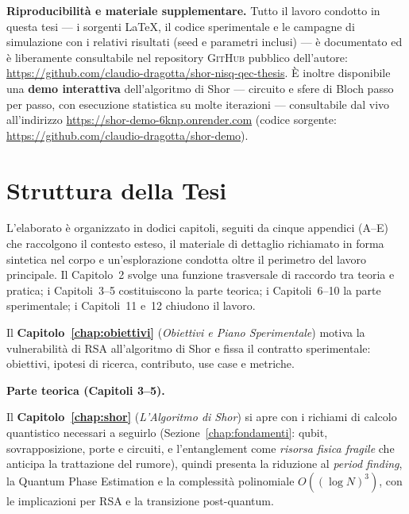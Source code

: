 \begin{onehalfspace}
\medskip
\noindent\textbf{Riproducibilità e materiale supplementare.} Tutto il lavoro condotto in questa tesi --- i sorgenti \LaTeX{}, il codice sperimentale e le campagne di simulazione con i relativi risultati (seed e parametri inclusi) --- è documentato ed è liberamente consultabile nel repository \textsc{GitHub} pubblico dell'autore: \url{https://github.com/claudio-dragotta/shor-nisq-qec-thesis}. È inoltre disponibile una \textbf{demo interattiva} dell'algoritmo di Shor --- circuito e sfere di Bloch passo per passo, con esecuzione statistica su molte iterazioni --- consultabile dal vivo all'indirizzo \url{https://shor-demo-6knp.onrender.com} (codice sorgente: \url{https://github.com/claudio-dragotta/shor-demo}).

\clearpage
\section{Struttura della Tesi}

L'elaborato è organizzato in dodici capitoli, seguiti da cinque appendici (A--E) che raccolgono il contesto esteso, il materiale di dettaglio richiamato in forma sintetica nel corpo e un'esplorazione condotta oltre il perimetro del lavoro principale. Il Capitolo~2 svolge una funzione trasversale di raccordo tra teoria e pratica; i Capitoli~3--5 costituiscono la parte teorica; i Capitoli~6--10 la parte sperimentale; i Capitoli~11 e~12 chiudono il lavoro.

\medskip
Il \textbf{Capitolo~\ref{chap:obiettivi}} (\textit{Obiettivi e Piano Sperimentale}) motiva la vulnerabilità di RSA all'algoritmo di Shor e fissa il contratto sperimentale: obiettivi, ipotesi di ricerca, contributo, use case e metriche.

\medskip
\textbf{Parte teorica (Capitoli 3--5).}

Il \textbf{Capitolo~\ref{chap:shor}} (\textit{L'Algoritmo di Shor}) si apre con i richiami di calcolo quantistico necessari a seguirlo (Sezione~\ref{chap:fondamenti}: qubit, sovrapposizione, porte e circuiti, e l'entanglement come \textit{risorsa fisica fragile} che anticipa la trattazione del rumore), quindi presenta la riduzione al \textit{period finding}, la Quantum Phase Estimation e la complessità polinomiale $O((\log N)^3)$, con le implicazioni per RSA e la transizione post-quantum.


\end{onehalfspace}
